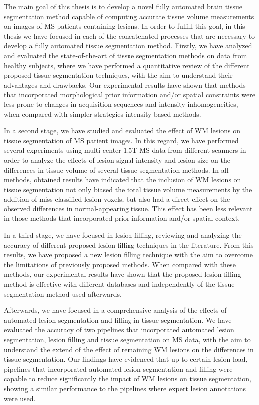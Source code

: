 The main goal of this thesis is to develop a novel fully automated brain tissue segmentation method capable of computing accurate tissue volume measurements on images of MS patients containing lesions. In order to fulfill this goal, in this thesis we have focused in each of the concatenated processes that are necessary to develop a fully automated tissue segmentation method. Firstly, we have analyzed and evaluated the state-of-the-art of tissue segmentation methods on data from healthy subjects, where we have performed a quantitative review of the different proposed tissue segmentation techniques, with the aim to understand their advantages and drawbacks. Our experimental results have shown that methods that incorporated morphological prior information and/or spatial constraints were less prone to changes in acquisition sequences and intensity inhomogeneities, when compared with simpler strategies intensity based methods.   

In a second stage, we have studied and evaluated the effect of WM lesions on tissue segmentation of MS patient images. In this regard, we have performed several experiments using multi-center 1.5T MS data from different scanners in order to analyze the effects of lesion signal intensity and lesion size on the differences in tissue volume of several tissue segmentation methods. In all methods, obtained results have indicated that the inclusion of WM lesions on tissue segmentation not only biased the total tissue volume measurements by the addition of miss-classified lesion voxels, but also had a direct effect on the observed differences in normal-appearing tissue. This effect has been less relevant in those methods that incorporated prior information and/or spatial context. 

In a third stage, we have focused in lesion filling, reviewing and analyzing the accuracy of different proposed lesion filling techniques in the literature. From this results, we have proposed a new lesion filling technique with the aim to overcome the limitations of previously proposed methods. When compared with these methods, our experimental results have shown that the proposed lesion filling method is effective  with different databases and independently of the tissue segmentation method used afterwards. 

Afterwards, we have focused in a comprehensive analysis of the effects of automated lesion segmentation and filling in tissue segmentation. We have evaluated the accuracy of two pipelines that incorporated automated lesion segmentation, lesion filling and tissue segmentation on MS data, with the aim to understand the extend of the effect of remaining WM lesions on the differences in tissue segmentation. Our findings have evidenced that up to certain lesion load, pipelines that incorporated automated lesion segmentation and filling were capable to reduce significantly the impact of WM lesions on tissue segmentation, showing a similar performance to the pipelines where expert lesion annotations were used.

